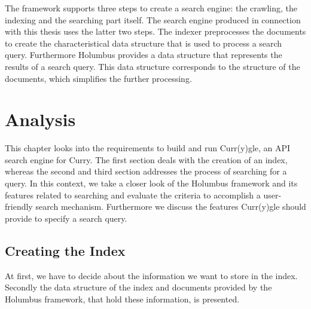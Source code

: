 \documentclass[%
	pdftex,%
	a4paper,%
	oneside,%
	chapterprefix,%
	headsepline,%
	12pt%
]{scrbook}
\begin{document}
The framework supports three steps to create a search engine: the
crawling, the indexing and the searching part itself. The search
engine produced in connection with this thesis uses the latter two steps. The
indexer preprocesses the documents to create the characteristical data
structure that is used to process a search query. Furthermore Holumbus
provides a data structure that represents the results of a search
query. This data structure corresponds to the structure of the
documents, which simplifies the further processing.\\

\chapter{Analysis}\label{analysis}
This chapter looks into the requirements to build and run Curr(y)gle,
an API search engine for Curry. The first section deals with the
creation of an index, whereas the second and third section addresses
the process of searching for a query. In this context, we take a
closer look of the Holumbus framework and its features related to
searching and evaluate the criteria to accomplish a user-friendly
search mechanism. Furthermore we discuss the features Curr(y)gle
should provide to specify a search query. %




\section{Creating the Index}
At first, we have to decide about the information we want to store in
the index. Secondly the data structure of the index and documents
provided by the Holumbus framework, that hold
these information, is presented.\\
\end{document}
